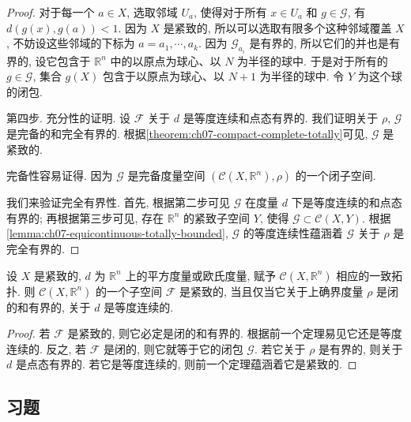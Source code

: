 \documentclass[../../main.tex]{subfiles}
\begin{document}
\begin{proof}
对于每一个 $a\in X$, 选取邻域 $U_a$, 使得对于所有 $x\in U_a$ 和 $g\in\mathcal{G}$, 有 $d(g(x),g(a))<1$. 因为 $X$ 是紧致的, 所以可以选取有限多个这种邻域覆盖 $X$, 不妨设这些邻域的下标为 $a=a_1,\cdots,a_k$. 因为 $\mathcal{G}_{a_i}$ 是有界的, 所以它们的并也是有界的, 设它包含于 $\mathbb{R}^n$ 中的以原点为球心、以 $N$ 为半径的球中. 于是对于所有的 $g\in\mathcal{G}$, 集合 $g(X)$ 包含于以原点为球心、以 $N+1$ 为半径的球中. 令 $Y$ 为这个球的闭包.

第四步. 充分性的证明. 设 $\mathcal{F}$ 关于 $d$ 是等度连续和点态有界的. 我们证明关于 $\rho$, $\mathcal{G}$ 是完备的和完全有界的. 根据\cref{theorem:ch07-compact-complete-totally}可见, $\mathcal{G}$ 是紧致的.

完备性容易证得. 因为 $\mathcal{G}$ 是完备度量空间 $(\mathcal{C}(X,\mathbb{R}^n),\rho)$ 的一个闭子空间.

我们来验证完全有界性. 首先, 根据第二步可见 $\mathcal{G}$ 在度量 $d$ 下是等度连续的和点态有界的; 再根据第三步可见, 存在 $\mathbb{R}^n$ 的紧致子空间 $Y$, 使得 $\mathcal{G}\subset\mathcal{C}(X,Y)$. 根据\cref{lemma:ch07-equicontinuous-totally-bounded}, $\mathcal{G}$ 的等度连续性蕴涵着 $\mathcal{G}$ 关于 $\rho$ 是完全有界的.
\end{proof}

\begin{corollary}\label{corollary:ch07-ascoli-classical}
设 $X$ 是紧致的, $d$ 为 $\mathbb{R}^n$ 上的平方度量或欧氏度量, 赋予 $\mathcal{C}(X,\mathbb{R}^n)$ 相应的一致拓扑. 则 $\mathcal{C}(X,\mathbb{R}^n)$ 的一个子空间 $\mathcal{F}$ 是紧致的, 当且仅当它关于上确界度量 $\rho$ 是闭的和有界的, 关于 $d$ 是等度连续的.
\end{corollary}

\begin{proof}
若 $\mathcal{F}$ 是紧致的, 则它必定是闭的和有界的. 根据前一个定理易见它还是等度连续的. 反之, 若 $\mathcal{F}$ 是闭的, 则它就等于它的闭包 $\mathcal{G}$. 若它关于 $\rho$ 是有界的, 则关于 $d$ 是点态有界的. 若它是等度连续的, 则前一个定理蕴涵着它是紧致的.
\end{proof}

\subsection*{习题}
\end{document}

